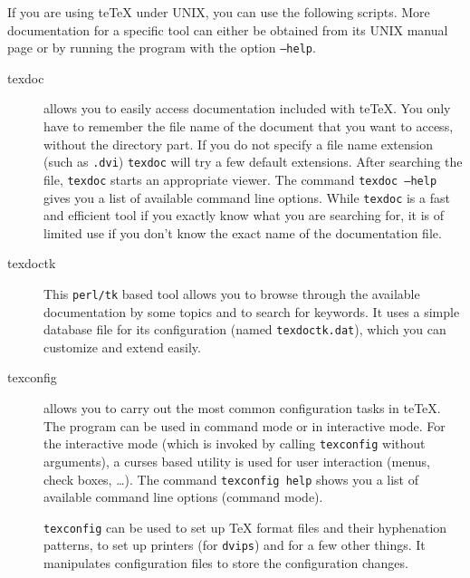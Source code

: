 \documentclass[11pt,a4paper]{article}
\newcommand{\teTeX}{\textrm{te}\TeX\xspace}
\begin{document}
If you are using \teTeX{} under UNIX, you can use the following
scripts. More documentation for a specific tool can either be obtained
from its UNIX manual page or by running the program with the option
\texttt{--help}. 
\begin{description}
\item[texdoc] allows you to easily access documentation included with
  \teTeX. You only have to remember the file name of the document that
  you want to access, without the directory part. If you do not
  specify a file name extension (such as \texttt{.dvi})
  \texttt{texdoc} will try a few default extensions. After searching
  the file, \texttt{texdoc} starts an appropriate viewer.  The command
  \texttt{texdoc~--help} gives you a list of available command line
  options. While \texttt{texdoc} is a fast and efficient tool if you
  exactly know what you are searching for, it is of limited use if you
  don't know the exact name of the documentation file.
\item [texdoctk] This \texttt{perl/tk} based tool allows you to browse
  through the available documentation by some topics and to search for
  keywords. It uses a simple database file for its configuration
  (named \texttt{texdoctk.dat}), which you can customize and extend
  easily.
\item[texconfig] allows you to carry out the most common configuration
  tasks in \teTeX. The program can be used in command mode or in
  interactive mode. For the interactive mode (which is invoked by
  calling \texttt{texconfig} without arguments), a curses based
  utility is used for user interaction (menus, check boxes, \ldots).
  The command \texttt{texconfig help} shows you a list of available
  command line options (command mode).
  
  \verb+texconfig+ can be used to set up \TeX{} format files and their
  hyphenation patterns, to set up printers (for \verb+dvips+) and for
  a few other things.  It manipulates configuration files to store the
  configuration changes.
  

\end{description}
\end{document}
